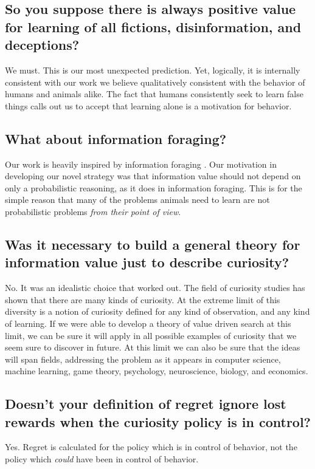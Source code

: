 \subsection*{So you suppose there is always positive value for learning of all fictions, disinformation, and deceptions?}
We must. This is our most unexpected prediction. Yet, logically, it is internally consistent with our work we believe qualitatively consistent with the behavior of humans and animals alike. The fact that humans consistently seek to learn false things calls out us to accept that learning alone is a motivation for behavior.


\subsection*{What about information foraging?}
Our work is heavily inspired by information foraging \citep{Inglis2001,Reddy2016}. Our motivation in developing our novel strategy was that information value should not depend on only a probabilistic reasoning, as it does in information foraging. This is for the simple reason that many of the problems animals need to learn are not probabilistic problems \textit{from their point of view}. 


\subsection*{Was it necessary to build a general theory for information value just to describe curiosity?}
No. It was an idealistic choice that worked out. The field of curiosity studies has shown that there are many kinds of curiosity. At the extreme limit of this diversity is a notion of curiosity defined for any kind of observation, and any kind of learning. If we were able to develop a theory of value driven search at this limit, we can be sure it will apply in all possible examples of curiosity that we seem sure to discover in future. At this limit we can also be sure that the ideas will span fields, addressing the problem as it appears in computer science, machine learning, game theory, psychology, neuroscience, biology, and economics.


\subsection*{Doesn't your definition of regret ignore lost rewards when the curiosity policy is in control?}
Yes. Regret is calculated for the policy which is in control of behavior, not the policy which \textit{could} have been in control of behavior.



